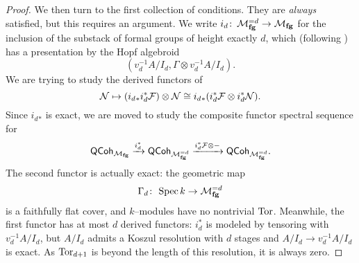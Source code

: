 \begin{proof}
We then turn to the first collection of conditions.  They are \emph{always} satisfied, but this requires an argument.  We write $i_d\colon\thinspace \mathcal{M}_{\mathbf{fg}}^{= d} \to \mathcal{M}_{\mathbf{fg}}$ for the inclusion of the substack of formal groups of height exactly $d$, which (following ) has a presentation by the Hopf algebroid \[(v_d^{-1} A / I_d, \Gamma \otimes v_d^{-1} A / I_d).\]  We are trying to study the derived functors of \[\mathcal{N} \mapsto (i_d{}_* i_d^* \mathcal{F}) \otimes \mathcal{N} \cong i_d{}_* (i_d^* \mathcal{F} \otimes i_d^* \mathcal{N}).\]  Since $i_d{}_*$ is exact, we are moved to study the composite functor spectral sequence for \[\mathsf{QCoh}_{\mathcal{M}_{\mathbf{fg}}} \xrightarrow{i_d^*} \mathsf{QCoh}_{\mathcal{M}_{\mathbf{fg}}^{=d}} \xrightarrow{i_d^* \mathcal{F} \otimes -} \mathsf{QCoh}_{\mathcal{M}_{\mathbf{fg}}^{=d}}.\]  The second functor is actually exact: the geometric map \[\Gamma_d\colon\thinspace \operatorname{Spec} k \to \mathcal{M}_{\mathbf{fg}}^{=d}\] is a faithfully flat cover, and $k$--modules have no nontrivial $\operatorname{Tor}$.  Meanwhile, the first functor has at most $d$ derived functors: $i_d^*$ is modeled by tensoring with $v_d^{-1} A / I_d$, but $A / I_d$ admits a Koszul resolution with $d$ stages and $A / I_d \to v_d^{-1} A / I_d$ is exact.  As $\operatorname{Tor}_{d+1}$ is beyond the length of this resolution, it is always zero.
\end{proof}

